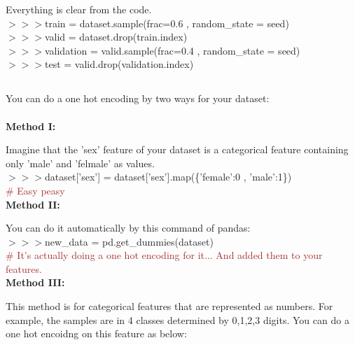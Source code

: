 \documentclass[a4paper,18pt]{article}
\begin{document}
Everything is clear from the code.\\

$>>>$train = dataset.sample(frac=0.6 , random\_state = seed)\\

$>>>$valid = dataset.drop(train.index)\\

$>>>$validation = valid.sample(frac=0.4 , random\_state = seed)\\

$>>>$test = valid.drop(validation.index)\\


\subsection{\colorbox {matgreen}{\color{white}{\large One Hot Encoding}}}
You can do a one hot encoding by two ways for your dataset:\\\\
\textbf{Method I:\\}

Imagine that the 'sex' feature of your dataset is a categorical feature containing only 'male' and 'felmale' as values.\\

$>>>$dataset['sex'] = dataset['sex'].map(\{'female':0 , 'male':1\})\\

{\textcolor{brown}{\# Easy peasy}}\\

\textbf{Method II:\\}

You can do it automatically by this command of pandas:\\

$>>>$new\_data = pd.get\_dummies(dataset)\\

{\textcolor{brown}{\# It's actually doing a one hot encoding for it... And added them to your features.}}\\

\textbf{Method III:\\}

This method is for categorical features that are represented as numbers. For example, the samples are in 4 classes determined by 0,1,2,3 digits. You can do a one hot encoidng on this feature as below:
\end{document}
